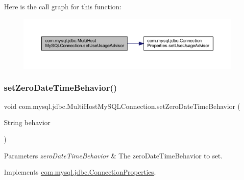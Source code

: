 Here is the call graph for this function\+:
\nopagebreak
\begin{figure}[H]
\begin{center}
\leavevmode
\includegraphics[width=350pt]{classcom_1_1mysql_1_1jdbc_1_1_multi_host_my_s_q_l_connection_a7a7245490c0727f69175b55bb9d7c39b_cgraph}
\end{center}
\end{figure}
\mbox{\label{classcom_1_1mysql_1_1jdbc_1_1_multi_host_my_s_q_l_connection_a236306cd02b385607ef0b443508b4f89}} 
\subsubsection{\texorpdfstring{set\+Zero\+Date\+Time\+Behavior()}{setZeroDateTimeBehavior()}}
{\footnotesize\ttfamily void com.\+mysql.\+jdbc.\+Multi\+Host\+My\+S\+Q\+L\+Connection.\+set\+Zero\+Date\+Time\+Behavior (\begin{DoxyParamCaption}\item[{String}]{behavior }\end{DoxyParamCaption})}


\begin{DoxyParams}{Parameters}
{\em zero\+Date\+Time\+Behavior} & The zero\+Date\+Time\+Behavior to set. \\
\hline
\end{DoxyParams}


Implements \mbox{\hyperlink{interfacecom_1_1mysql_1_1jdbc_1_1_connection_properties_a985e00fab1822f34c53443de78f7f597}{com.\+mysql.\+jdbc.\+Connection\+Properties}}.

